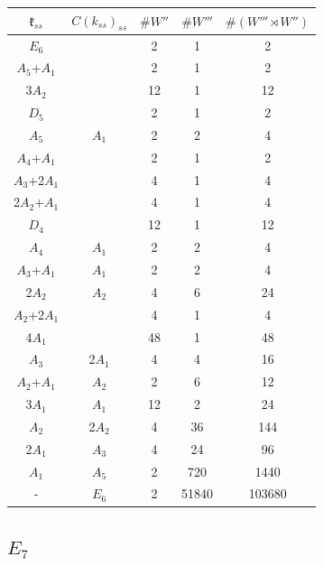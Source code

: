 \documentclass[12pt]{report}
\begin{document}
\begin{appendix}
{\begin{tabular}{ccccc}$\mathfrak{k}_{ss}$& $C(k_{ss})_{ss}$ & $\#W''$ &$\#W'''$&$\#(W'''\rtimes W'')$\\\hline$E_6$ &  & 2 & 1 & 2 \\
$A_5$+$A_1$ &  & 2 & 1 & 2 \\
3$A_2$ &  & 12 & 1 & 12 \\
$D_5$ &  & 2 & 1 & 2 \\
$A_5$ & $A_1$ & 2 & 2 & 4 \\
$A_4$+$A_1$ &  & 2 & 1 & 2 \\
$A_3$+2$A_1$ &  & 4 & 1 & 4 \\
2$A_2$+$A_1$ &  & 4 & 1 & 4 \\
$D_4$ &  & 12 & 1 & 12 \\
$A_4$ & $A_1$ & 2 & 2 & 4 \\
$A_3$+$A_1$ & $A_1$ & 2 & 2 & 4 \\
2$A_2$ & $A_2$ & 4 & 6 & 24 \\
$A_2$+2$A_1$ &  & 4 & 1 & 4 \\
4$A_1$ &  & 48 & 1 & 48 \\
$A_3$ & 2$A_1$ & 4 & 4 & 16 \\
$A_2$+$A_1$ & $A_2$ & 2 & 6 & 12 \\
3$A_1$ & $A_1$ & 12 & 2 & 24 \\
$A_2$ & 2$A_2$ & 4 & 36 & 144 \\
2$A_1$ & $A_3$ & 4 & 24 & 96 \\
$A_1$ & $A_5$ & 2 & 720 & 1440 \\
- & $E_6$ & 2 & 51840 & 103680 \\
\end{tabular}


\subsection{$E_7$}


}
\end{appendix}
\end{document}
